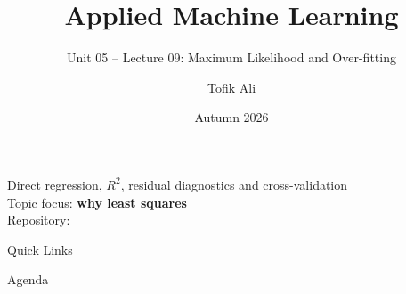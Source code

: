 \documentclass[aspectratio=169]{beamer}
\title[Applied Machine Learning]{Applied Machine Learning}
\subtitle{Unit 05 -- Lecture 09: Maximum Likelihood and Over-fitting}
\author{Tofik Ali}
\institute{School of Computer Science, UPES Dehradun}
\date{Autumn 2026}
\begin{document}
\UPESCoverFrame
\setcounter{framenumber}{0}

\begin{frame}
  \titlepage
  \begin{center}
    \footnotesize Direct regression, $R^2$, residual diagnostics and
    cross-validation\\[0.2em]
    \footnotesize Topic focus: \textbf{why least squares}\\[0.2em]
    \footnotesize Repository: \texttt{\AMLRepoURL}
  \end{center}
  \slidesources{\AMLUnitVSources}
\end{frame}

\begin{frame}{Quick Links}
  \centering
  \hyperlink{sec:direct}{}\hspace{0.4em}
  \hyperlink{sec:mle}{}\hspace{0.4em}
  \hyperlink{sec:r2}{}\hspace{0.4em}
  \hyperlink{sec:adequacy}{}\hspace{0.4em}
  \hyperlink{sec:overfit}{}\hspace{0.4em}
  \hyperlink{sec:cv}{}\hspace{0.4em}
  \hyperlink{sec:summary}{}
\end{frame}

\begin{frame}{Agenda}
  \tableofcontents
\end{frame}
\end{document}
